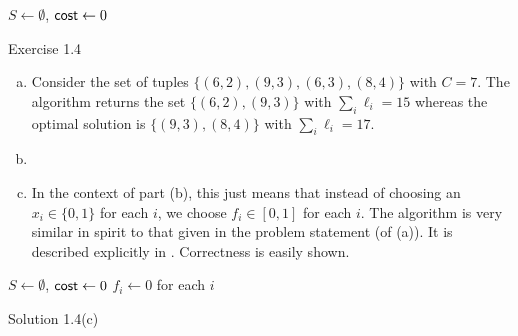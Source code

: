 \begin{algorithm}
	\DontPrintSemicolon
	\SetNoFillComment
	 
	$S\gets\emptyset$, $\mathsf{cost}\gets 0$\;
	\caption{Exercise 1.4}\label{algo: ex 1.4}
\end{algorithm}

\begin{solution*}
	\begin{enumerate}[(a)]
		\item Consider the set of tuples $\{(6,2),(9,3),(6,3),(8,4)\}$ with $C=7$. The algorithm returns the set $\{(6,2),(9,3)\}$ with $\sum_i \ell_i=15$ whereas the optimal solution is $\{(9,3),(8,4)\}$ with $\sum_i \ell_i = 17$.

		\item 

		\item In the context of part (b), this just means that instead of choosing an $x_i\in\{0,1\}$ for each $i$, we choose $f_i\in[0,1]$ for each $i$. The algorithm is very similar in spirit to that given in the problem statement (of (a)). It is described explicitly in . Correctness is easily shown.

	\end{enumerate}
\end{solution*}


\begin{algorithm}
	\DontPrintSemicolon
	\SetNoFillComment
	\;
	$S\gets\emptyset$, $\mathsf{cost}\gets 0$\;
	$f_i\gets 0$ for each $i$\;
	\caption{Solution 1.4(c)}\label{algo: sol 1.4(c)}
\end{algorithm}

